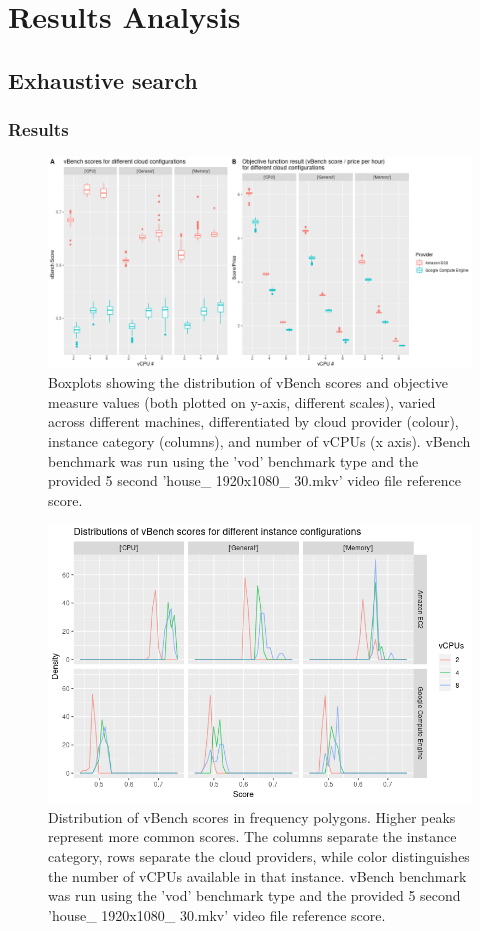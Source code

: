 \documentclass{report}
\begin{document}
\section{Results Analysis}
\subsection{Exhaustive search}
\subsubsection{Results}
\begin{figure}
  \centering
   \includegraphics[scale=0.6]{exh_search}
   \caption{Boxplots showing the distribution of vBench scores and objective measure values (both plotted on y-axis, different scales), varied across different machines, differentiated by cloud provider (colour), instance category (columns), and number of vCPUs (x axis). vBench benchmark was run using the 'vod' benchmark type and the provided 5 second 'house\_ 1920x1080\_ 30.mkv' video file reference score.}
  \label{fig:exh-search}
\end{figure}
\begin{figure}[!ht]
  \centering
   \includegraphics[scale=0.7]{vbench_dists}
   \caption{Distribution of vBench scores in frequency polygons. Higher peaks represent more common scores. The columns separate the instance category, rows separate the cloud providers, while color distinguishes the number of vCPUs available in that instance. vBench benchmark was run using the 'vod' benchmark type and the provided 5 second 'house\_ 1920x1080\_ 30.mkv' video file reference score.}
  \label{fig:vbench-dists}
\end{figure}
\end{document}
